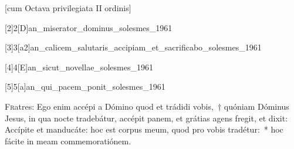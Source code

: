 \documentclass[vesperale_romanum.tex]{subfiles}
\begin{document}


\newpage

\thispagestyle{empty}


\thispagestyle{empty}

[cum Octava privilegiata II ordinis]

 \label{1_vesperis_cc}





[2]{2}[D]{an_miserator_dominus_solesmes_1961}

 
 

[3]{3}[a2]{an_calicem_salutaris_accipiam_et_sacrificabo_solesmes_1961}
\label{115_3a2} 
{}

[4]{4}[E]{an_sicut_novellae_solesmes_1961}
\label{127_4E}
{}

[5]{5}[a]{an_qui_pacem_ponit_solesmes_1961}
\label{147_5}


\lettrine{F}{r}atres: Ego enim accépi a Dómino quod et trádidi vobis,~† quóniam Dóminus Jesus, in qua no\-cte tradebátur, accépit panem, et grátias agens fregit, et dixit: Accípite et manducáte: hoc est corpus meum, quod pro vobis tradétur:~* hoc fácite in meam commemoratiónem.

 \label{hy_pange_lingua_corpus_christi_solesmes}
\end{document}
